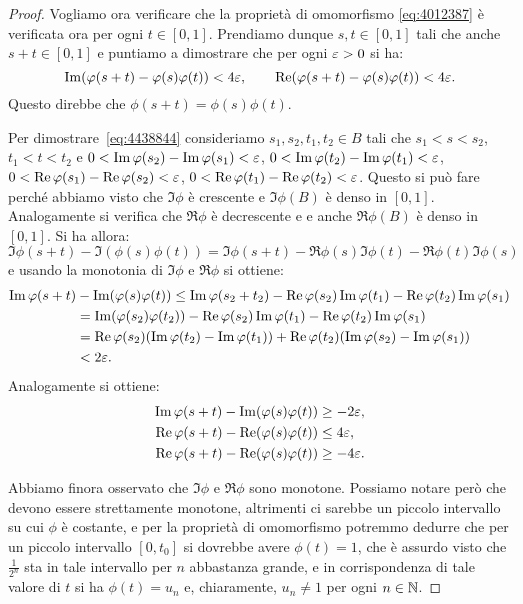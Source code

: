 \begin{proof}
Vogliamo ora verificare che la proprietà di omomorfismo 
\eqref{eq:4012387} è verificata
ora per ogni $t\in [0,1]$.
Prendiamo dunque $s,t\in[0,1]$ tali che anche $s+t\in [0,1]$
e puntiamo a dimostrare che per ogni $\varepsilon>0$ 
si ha:
\begin{equation}\label{eq:4438844}
  \operatorname{Im}(\varphi(s+t)- \varphi(s)\varphi(t)) < 4\varepsilon,
  \qquad
  \operatorname{Re}(\varphi(s+t)-\varphi(s)\varphi(t)) < 4\varepsilon.
\end{equation}
Questo direbbe che $\phi(s+t)=\phi(s)\phi(t)$.

Per dimostrare~\eqref{eq:4438844} consideriamo 
$s_1,s_2,t_1,t_2\in B$ tali che $s_1<s<s_2$, 
$t_1<t<t_2$
e $0<\operatorname{Im} \varphi(s_2)-\operatorname{Im} \varphi(s_1)<\varepsilon$, $0<\operatorname{Im} \varphi(t_2)-\operatorname{Im} \varphi(t_1)<\varepsilon$,
  $0<\operatorname{Re} \varphi(s_1)-\operatorname{Re} \varphi(s_2)<\varepsilon$, $0<\operatorname{Re} \varphi(t_1)-\operatorname{Re} \varphi(t_2)<\varepsilon$.
Questo si può fare perché abbiamo visto che $\Im  \phi$ è crescente 
e $\Im \phi(B)$ è denso in $[0,1]$.
Analogamente si verifica che $\Re \phi$ è decrescente e
e anche $\Re \phi(B)$ è denso in $[0,1]$.
Si ha allora:
\[
\Im \phi(s+t) - \Im (\phi(s)\phi(t))
= \Im \phi(s+t) - \Re \phi(s)\Im \phi(t) - \Re \phi(t)\Im \phi(s)
\]
e usando la monotonia di $\Im \phi$ e $\Re \phi$ si ottiene:
\begin{align*}
\operatorname{Im} \varphi(s+t) &- \operatorname{Im} (\varphi(s)\varphi(t))
\le \operatorname{Im} \varphi(s_2+t_2) - \operatorname{Re} \varphi(s_2)\operatorname{Im} \varphi(t_1) - \operatorname{Re} \varphi(t_2)\operatorname{Im} \varphi(s_1)\\ 
&= \operatorname{Im} (\varphi(s_2)\varphi(t_2)) - \operatorname{Re} \varphi(s_2)\operatorname{Im} \varphi(t_1) - \operatorname{Re} \varphi(t_2)\operatorname{Im} \varphi(s_1)\\ 
&= \operatorname{Re}\varphi(s_2)(\operatorname{Im}\varphi(t_2) - \operatorname{Im} \varphi(t_1))+\operatorname{Re}\varphi(t_2)(\operatorname{Im}\varphi(s_2) - \operatorname{Im} \varphi(s_1))\\
&< 2\varepsilon.
\end{align*}
Analogamente si ottiene:
\begin{align*}
\operatorname{Im} \varphi(s+t) - \operatorname{Im} (\varphi(s)\varphi(t))
&\ge -2\varepsilon,\\
\operatorname{Re} \varphi(s+t) - \operatorname{Re} (\varphi(s)\varphi(t))
&\le 4\varepsilon,\\
\operatorname{Re} \varphi(s+t) - \operatorname{Re} (\varphi(s)\varphi(t))
&\ge -4\varepsilon.
\end{align*}

Abbiamo finora osservato che $\Im \phi$ e $\Re \phi$ sono monotone.
Possiamo notare però che devono essere strettamente monotone, altrimenti 
ci sarebbe un piccolo intervallo su cui $\phi$ è costante, e per la proprietà 
di omomorfismo potremmo dedurre che per un piccolo intervallo $[0,t_0]$ 
si dovrebbe avere $\phi(t)=1$, che è assurdo visto che $\frac{1}{2^n}$ 
sta in tale intervallo per $n$ abbastanza grande, e in corrispondenza 
di tale valore di $t$ si ha $\phi(t)=u_n$ e, chiaramente, $u_n\neq 1$
per ogni $n\in {\mathbb N}$.


\end{proof}
